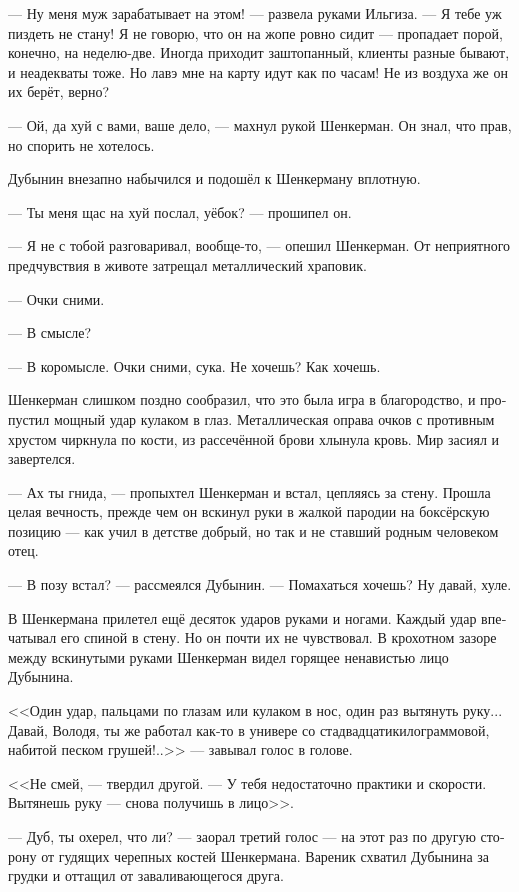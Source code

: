 \documentclass[a5paper,12pt,fleqn]{extbook}\usepackage{cooltooltips}\usepackage{polyglossia}\setdefaultlanguage[babelshorthands=true]{russian}\setotherlanguage{english}\defaultfontfeatures{Ligatures=TeX,Mapping=tex-text} \usepackage{xcolor}\definecolor{lightgray}{HTML}{bbbbbb}\color{lightgray}\newcommand{\ml}[3]{\textenglish{\textcolor{black}{#3}}}
\begin{document}
--- Ну меня муж зарабатывает на этом! --- развела руками Ильгиза.
--- Я тебе уж пиздеть не стану!
Я не говорю, что он на жопе ровно сидит --- пропадает порой, конечно, на неделю-две.
Иногда приходит заштопанный, клиенты разные бывают, и неадекваты тоже.
Но лавэ мне на карту идут как по часам!
Не из воздуха же он их берёт, верно?

--- Ой, да хуй с вами, ваше дело, --- махнул рукой Шенкерман.
Он знал, что прав, но спорить не хотелось.

Дубынин внезапно набычился и подошёл к Шенкерману вплотную.

--- Ты меня щас на хуй послал, уёбок? --- прошипел он.

--- Я не с тобой разговаривал, вообще-то, --- опешил Шенкерман.
От неприятного предчувствия в животе затрещал металлический храповик.

--- Очки сними.

--- В смысле?

--- В коромысле.
Очки сними, сука.
Не хочешь?
Как хочешь.

Шенкерман слишком поздно сообразил, что это была игра в благородство, и пропустил мощный удар кулаком в глаз.
Металлическая оправа очков с противным хрустом чиркнула по кости, из рассечённой брови хлынула кровь.
Мир засиял и завертелся.

--- Ах ты гнида, --- пропыхтел Шенкерман и встал, цепляясь за стену.
Прошла целая вечность, прежде чем он вскинул руки в жалкой пародии на боксёрскую позицию --- как учил в детстве добрый, но так и не ставший родным человеком отец.

--- В позу встал? --- рассмеялся Дубынин.
--- Помахаться хочешь?
Ну давай, хуле.

В Шенкермана прилетел ещё десяток ударов руками и ногами.
Каждый удар впечатывал его спиной в стену.
Но он почти их не чувствовал.
В крохотном зазоре между вскинутыми руками Шенкерман видел горящее ненавистью лицо Дубынина.

<<Один удар, пальцами по глазам или кулаком в нос, один раз вытянуть руку...
Давай, Володя, ты же работал как-то в универе со стадвадцатикилограммовой, набитой песком грушей!..>> --- завывал голос в голове.

<<Не смей, --- твердил другой.
--- У тебя недостаточно практики и скорости.
Вытянешь руку --- снова получишь в лицо>>.

--- Дуб, ты охерел, что ли? --- заорал третий голос --- на этот раз по другую сторону от гудящих черепных костей Шенкермана.
Вареник схватил Дубынина за грудки и оттащил от заваливающегося друга.
\end{document}
